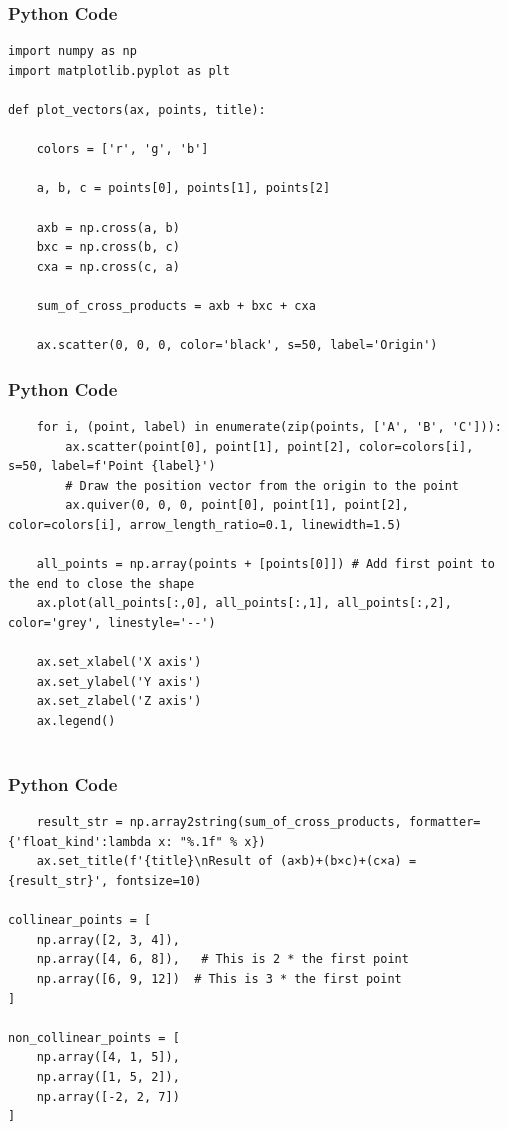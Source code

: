 \documentclass{beamer}
\begin{document}
\begin{frame}[fragile]
    \frametitle{Python Code}
    \begin{lstlisting}
import numpy as np
import matplotlib.pyplot as plt

def plot_vectors(ax, points, title):
   
    colors = ['r', 'g', 'b']
    
    a, b, c = points[0], points[1], points[2]

    axb = np.cross(a, b)
    bxc = np.cross(b, c)
    cxa = np.cross(c, a)
    
    sum_of_cross_products = axb + bxc + cxa
    
    ax.scatter(0, 0, 0, color='black', s=50, label='Origin')
    \end{lstlisting}
\end{frame}

\begin{frame}[fragile]
    \frametitle{Python Code}
    \begin{lstlisting}
    for i, (point, label) in enumerate(zip(points, ['A', 'B', 'C'])):
        ax.scatter(point[0], point[1], point[2], color=colors[i], s=50, label=f'Point {label}')
        # Draw the position vector from the origin to the point
        ax.quiver(0, 0, 0, point[0], point[1], point[2], color=colors[i], arrow_length_ratio=0.1, linewidth=1.5)

    all_points = np.array(points + [points[0]]) # Add first point to the end to close the shape
    ax.plot(all_points[:,0], all_points[:,1], all_points[:,2], color='grey', linestyle='--')

    ax.set_xlabel('X axis')
    ax.set_ylabel('Y axis')
    ax.set_zlabel('Z axis')
    ax.legend()
   
    \end{lstlisting}
\end{frame}

\begin{frame}[fragile]
    \frametitle{Python Code}
    \begin{lstlisting}
    result_str = np.array2string(sum_of_cross_products, formatter={'float_kind':lambda x: "%.1f" % x})
    ax.set_title(f'{title}\nResult of (a×b)+(b×c)+(c×a) = {result_str}', fontsize=10)

collinear_points = [
    np.array([2, 3, 4]),
    np.array([4, 6, 8]),   # This is 2 * the first point
    np.array([6, 9, 12])  # This is 3 * the first point
]

non_collinear_points = [
    np.array([4, 1, 5]),
    np.array([1, 5, 2]),
    np.array([-2, 2, 7])
]
  
    \end{lstlisting}
\end{frame}
\end{document}
